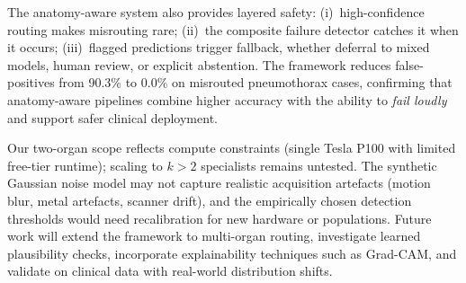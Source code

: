 \documentclass[a4paper,conference]{IEEEtran}
\begin{document}
The anatomy-aware system also provides layered safety: (i)~high-confidence routing makes misrouting rare; (ii)~the composite failure detector catches it when it occurs; (iii)~flagged predictions trigger fallback, whether deferral to mixed models, human review, or explicit abstention. The framework reduces false-positives from 90.3\% to 0.0\% on misrouted pneumothorax cases, confirming that anatomy-aware pipelines combine higher accuracy with the ability to \emph{fail loudly} and support safer clinical deployment.

Our two-organ scope reflects compute constraints (single Tesla P100 with limited free-tier runtime); scaling to $k>2$ specialists remains untested. The synthetic Gaussian noise model may not capture realistic acquisition artefacts (motion blur, metal artefacts, scanner drift), and the empirically chosen detection thresholds would need recalibration for new hardware or populations. Future work will extend the framework to multi-organ routing, investigate learned plausibility checks, incorporate explainability techniques such as Grad-CAM, and validate on clinical data with real-world distribution shifts.
\end{document}
